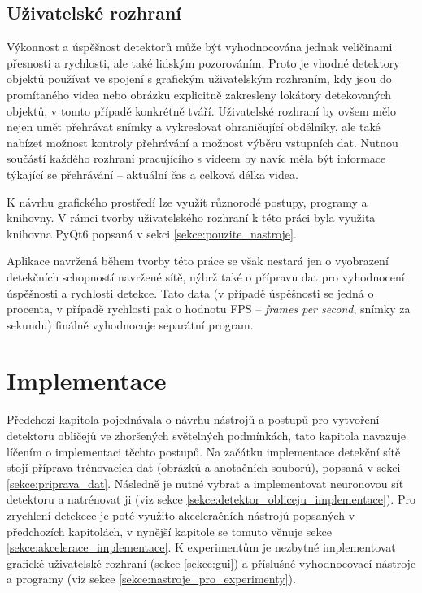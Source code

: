 \section{Uživatelské rozhraní}
Výkonnost a úspěšnost detektorů může být vyhodnocována jednak veličinami přesnosti a rychlosti, ale také lidským pozorováním. Proto je vhodné detektory objektů používat ve spojení s grafickým uživatelským rozhraním, kdy jsou do promítaného videa nebo obrázku explicitně zakresleny lokátory detekovaných objektů, v tomto případě konkrétně tváří. Uživatelské rozhraní by ovšem mělo nejen umět přehrávat snímky a vykreslovat ohraničující obdélníky, ale také nabízet možnost kontroly přehrávání a možnost výběru vstupních dat. Nutnou součástí každého rozhraní pracujícího s videem by navíc měla být informace týkající se přehrávání -- aktuální čas a celková délka videa.

K návrhu grafického prostředí lze využít různorodé postupy, programy a knihovny. V rámci tvorby uživatelského rozhraní k této práci byla využita knihovna PyQt6 popsaná v sekci \ref{sekce:pouzite_nastroje}.

Aplikace navržená během tvorby této práce se však nestará jen o vyobrazení detekčních schopností navržené sítě, nýbrž také o přípravu dat pro vyhodnocení úspěšnosti a rychlosti detekce. Tato data (v případě úspěšnosti se jedná o procenta, v případě rychlosti pak o hodnotu FPS -- \emph{frames per second}, snímky za sekundu) finálně vyhodnocuje separátní program.

\chapter{Implementace}
\label{kapitola:implementace}
Předchozí kapitola pojednávala o návrhu nástrojů a postupů pro vytvoření detektoru obličejů ve zhoršených světelných podmínkách, tato kapitola navazuje líčením o implementaci těchto postupů. Na začátku implementace detekční sítě stojí příprava trénovacích dat (obrázků a anotačních souborů), popsaná v sekci \ref{sekce:priprava_dat}. Následně je nutné vybrat a implementovat neuronovou síť detektoru a natrénovat ji (viz sekce \ref{sekce:detektor_obliceju_implementace}). Pro zrychlení detekece je poté využito akceleračních nástrojů popsaných v předchozích kapitolách, v nynější kapitole se tomuto věnuje sekce \ref{sekce:akcelerace_implementace}. K experimentům je nezbytné implementovat grafické uživatelské rozhraní (sekce \ref{sekce:gui}) a příslušné vyhodnocovací nástroje a programy (viz sekce \ref{sekce:nastroje_pro_experimenty}).

